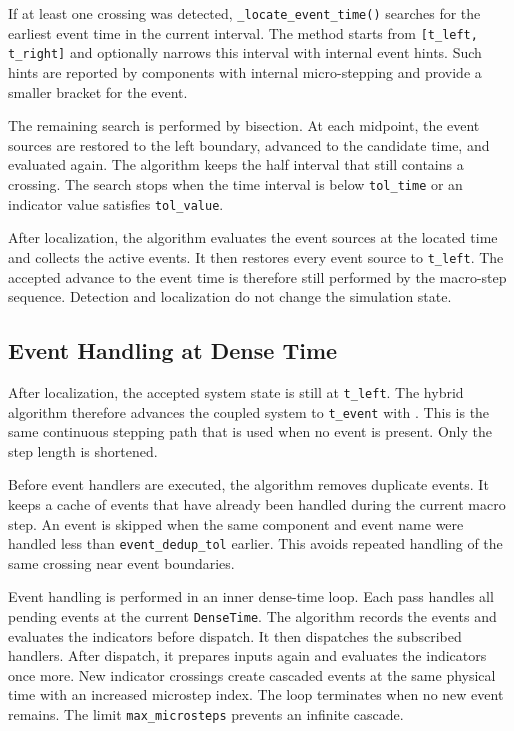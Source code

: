 If at least one crossing was detected, \texttt{\_locate\_event\_time()} searches for the earliest event time in the current interval.
The method starts from \texttt{[t\_left, t\_right]} and optionally narrows this interval with internal event hints.
Such hints are reported by components with internal micro-stepping and provide a smaller bracket for the event.

The remaining search is performed by bisection.
At each midpoint, the event sources are restored to the left boundary, advanced to the candidate time, and evaluated again.
The algorithm keeps the half interval that still contains a crossing.
The search stops when the time interval is below \texttt{tol\_time} or an indicator value satisfies \texttt{tol\_value}.

After localization, the algorithm evaluates the event sources at the located time and collects the active events.
It then restores every event source to \texttt{t\_left}.
The accepted advance to the event time is therefore still performed by the macro-step sequence.
Detection and localization do not change the simulation state.

\subsection{Event Handling at Dense Time}
\label{sec:impl_hybrid_handling}

After localization, the accepted system state is still at \texttt{t\_left}.
The hybrid algorithm therefore advances the coupled system to \texttt{t\_event} with .
This is the same continuous stepping path that is used when no event is present.
Only the step length is shortened.

Before event handlers are executed, the algorithm removes duplicate events.
It keeps a cache of events that have already been handled during the current macro step.
An event is skipped when the same component and event name were handled less than \texttt{event\_dedup\_tol} earlier.
This avoids repeated handling of the same crossing near event boundaries.

Event handling is performed in an inner dense-time loop.
Each pass handles all pending events at the current \texttt{DenseTime}.
The algorithm records the events and evaluates the indicators before dispatch.
It then dispatches the subscribed handlers.
After dispatch, it prepares inputs again and evaluates the indicators once more.
New indicator crossings create cascaded events at the same physical time with an increased microstep index.
The loop terminates when no new event remains.
The limit \texttt{max\_microsteps} prevents an infinite cascade.

